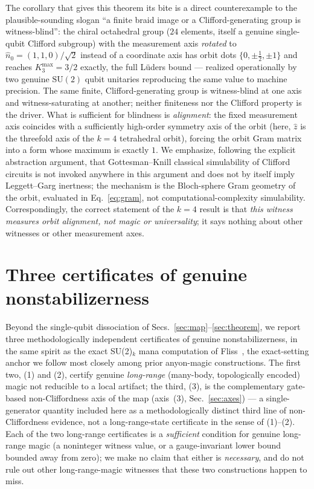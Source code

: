 \documentclass[aps,pra,twocolumn,superscriptaddress,longbibliography,floatfix,nofootinbib]{revtex4-2}
\begin{document}
The corollary that gives this theorem its bite is a direct
counterexample to the plausible-sounding slogan ``a finite braid image
or a Clifford-generating group is witness-blind'': the chiral
octahedral group ($24$ elements, itself a genuine single-qubit
Clifford subgroup) with the measurement axis \emph{rotated} to
$\hat n_0=(1,1,0)/\sqrt2$ instead of a coordinate axis has orbit dots
$\{0,\pm\tfrac12,\pm1\}$ and reaches $K_3^{\max}=3/2$ exactly, the full
Lüders bound --- realized operationally by two genuine $\mathrm{SU}(2)$
qubit unitaries reproducing the same value to machine precision. The
same finite, Clifford-generating group is witness-blind at one axis
and witness-saturating at another; neither finiteness nor the
Clifford property is the driver. What is sufficient for blindness is
\emph{alignment}: the fixed measurement axis coincides with a
sufficiently high-order symmetry axis of the orbit (here, $\hat z$ is
the threefold axis of the $k=4$ tetrahedral orbit), forcing the
orbit Gram matrix into a form whose maximum is exactly $1$. We
emphasize, following the explicit abstraction argument, that
Gottesman--Knill classical simulability of Clifford circuits is not
invoked anywhere in this argument and does not by itself imply
Leggett--Garg inertness; the mechanism is the Bloch-sphere Gram
geometry of the orbit, evaluated in Eq.~\eqref{eq:gram}, not
computational-complexity simulability. Correspondingly, the correct
statement of the $k=4$ result is that \emph{this witness measures
orbit alignment, not magic or universality}; it says nothing about
other witnesses or other measurement axes.

\section{Three certificates of genuine nonstabilizerness}
\label{sec:lrn}

Beyond the single-qubit dissociation of Secs.~\ref{sec:map}--\ref{sec:theorem},
we report three methodologically independent certificates of genuine
nonstabilizerness, in the same spirit as the exact SU(2)$_k$ mana
computation of Fliss~\cite{Fliss2021}, the exact-setting anchor we
follow most closely among prior anyon-magic constructions. The first
two, (1) and (2), certify genuine \emph{long-range} (many-body,
topologically encoded) magic not reducible to a local artifact; the
third, (3), is the complementary gate-based non-Cliffordness axis of
the map (axis~(3), Sec.~\ref{sec:axes}) --- a single-generator
quantity included here as a methodologically distinct third line of
non-Cliffordness evidence, not a long-range-state certificate in the
sense of (1)--(2). Each of the two long-range certificates is a
\emph{sufficient} condition for genuine long-range magic (a
noninteger witness value, or a gauge-invariant lower bound bounded
away from zero); we make no claim that either is \emph{necessary}, and
do not rule out other long-range-magic witnesses that these two
constructions happen to miss.
\end{document}
